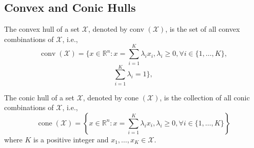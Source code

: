 \documentclass[english]{latex4ei_sheet}
\begin{document}
\begin{sectionbox}
\subsection{Convex and Conic Hulls}
The convex hull of a set $\mathcal{X}$, denoted by conv $(\mathcal{X})$, is the set of all convex combinations of $\mathcal{X}$, i.e.,
$$
\operatorname{conv}(\mathcal{X})=\{x \in \mathbb{R}^{n}: x=\sum_{i=1}^{K} \lambda_{i} x_{i}, \lambda_{i} \geq 0, \forall i \in\{1, \ldots, K\},$$
$$ 
\sum_{i=1}^{K} \lambda_{i}=1\},
$$

The conic hull of a set $\mathcal{X}$, denoted by cone $(\mathcal{X})$, is the collection of all conic combinations of $\mathcal{X}$, i.e.,
$$
\operatorname{cone}(\mathcal{X})=\left\{x \in \mathbb{R}^{n}: x=\sum_{i=1}^{K} \lambda_{i} x_{i}, \lambda_{i} \geq 0, \forall i \in\{1, \ldots, K\}\right\}
$$
where $K$ is a positive integer and $x_{1}, \ldots, x_{K} \in \mathcal{X}$.
\end{sectionbox}
\end{document}
